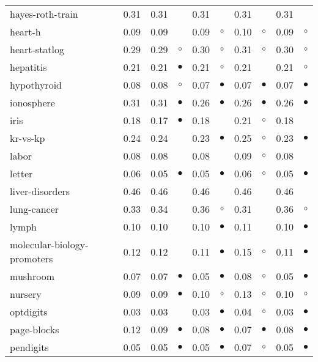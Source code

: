 {\begin{longtable}{lrr@{\hspace{0.1cm}}cr@{\hspace{0.1cm}}cr@{\hspace{0.1cm}}cr@{\hspace{0.1cm}}c}
hayes-roth-train & 0.31 & 0.31 &           & 0.31 &            & 0.31 &           & 0.31 &           \\
heart-h & 0.09 & 0.09 &           & 0.09 &    $\circ$ & 0.10 &   $\circ$ & 0.09 &    $\circ$\\
heart-statlog & 0.29 & 0.29 &   $\circ$ & 0.30 &    $\circ$ & 0.31 &   $\circ$ & 0.30 &    $\circ$\\
hepatitis & 0.21 & 0.21 & $\bullet$ & 0.21 &    $\circ$ & 0.21 &           & 0.21 &    $\circ$\\
hypothyroid & 0.08 & 0.08 &   $\circ$ & 0.07 &  $\bullet$ & 0.07 & $\bullet$ & 0.07 &  $\bullet$\\
ionosphere & 0.31 & 0.31 & $\bullet$ & 0.26 &  $\bullet$ & 0.26 & $\bullet$ & 0.26 &  $\bullet$\\
iris & 0.18 & 0.17 & $\bullet$ & 0.18 &            & 0.21 &   $\circ$ & 0.18 &           \\
kr-vs-kp & 0.24 & 0.24 &           & 0.23 &  $\bullet$ & 0.25 &   $\circ$ & 0.23 &  $\bullet$\\
labor & 0.08 & 0.08 &           & 0.08 &            & 0.09 &   $\circ$ & 0.08 &           \\
letter & 0.06 & 0.05 & $\bullet$ & 0.05 &  $\bullet$ & 0.06 &   $\circ$ & 0.05 &  $\bullet$\\
liver-disorders & 0.46 & 0.46 &           & 0.46 &            & 0.46 &           & 0.46 &           \\
lung-cancer & 0.33 & 0.34 &           & 0.36 &    $\circ$ & 0.31 &           & 0.36 &    $\circ$\\
lymph & 0.10 & 0.10 &           & 0.10 &  $\bullet$ & 0.11 &           & 0.10 &  $\bullet$\\
molecular-biology-promoters & 0.12 & 0.12 &           & 0.11 &  $\bullet$ & 0.15 &   $\circ$ & 0.11 &  $\bullet$\\
mushroom & 0.07 & 0.07 & $\bullet$ & 0.05 &  $\bullet$ & 0.08 &   $\circ$ & 0.05 &  $\bullet$\\
nursery & 0.09 & 0.09 & $\bullet$ & 0.10 &    $\circ$ & 0.13 &   $\circ$ & 0.10 &    $\circ$\\
optdigits & 0.03 & 0.03 &           & 0.03 &  $\bullet$ & 0.04 &   $\circ$ & 0.03 &  $\bullet$\\
page-blocks & 0.12 & 0.09 & $\bullet$ & 0.08 &  $\bullet$ & 0.07 & $\bullet$ & 0.08 &  $\bullet$\\
pendigits & 0.05 & 0.05 & $\bullet$ & 0.05 &  $\bullet$ & 0.07 &   $\circ$ & 0.05 &  $\bullet$\\

\end{longtable}}
